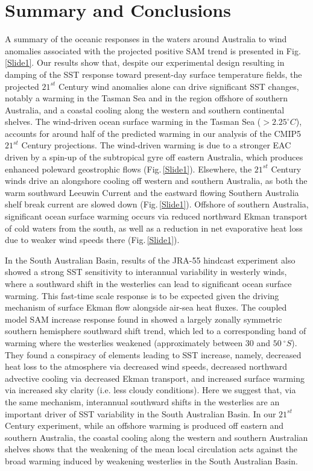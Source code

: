 \documentclass[draft,linenumbers]{agujournal2018}
\begin{document}
\section{Summary and Conclusions}
A summary of the oceanic responses in the waters around Australia to wind anomalies associated with the projected positive SAM trend is presented in Fig.\,\ref{Slide1}. Our results show that, despite our experimental design resulting in damping of the SST response toward present-day surface temperature fields, the projected $21^{st}$ Century wind anomalies alone can drive significant SST changes, notably a warming in the Tasman Sea and in the region offshore of southern Australia, and a coastal cooling along the western and southern continental shelves. The wind-driven ocean surface warming in the Tasman Sea ($> 2.25 ^{\circ}C$), accounts for around half of the predicted warming in our analysis of the CMIP5 $21^{st}$ Century projections. The wind-driven warming is due to a stronger EAC driven by a spin-up of the subtropical gyre off eastern Australia, which produces enhanced poleward geostrophic flows (Fig.\,\ref{Slide1}). Elsewhere, the $21^{st}$ Century winds drive an alongshore cooling off western and southern Australia, as both the warm southward Leeuwin Current and the eastward flowing Southern Australia shelf break current are slowed down (Fig.\,\ref{Slide1}). Offshore of southern Australia, significant ocean surface warming occurs via reduced northward Ekman transport of cold waters from the south, as well as a reduction in net evaporative heat loss due to weaker wind speeds there (Fig.\,\ref{Slide1}).

In the South Australian Basin, results of the JRA-55 hindcast experiment also showed a strong SST sensitivity to interannual variability in westerly winds, where a southward shift in the westerlies can lead to significant ocean surface warming. This fast-time scale response is to be expected given the driving mechanism of surface Ekman flow alongside air-sea heat fluxes. The coupled model SAM increase response found in \citet{SenGupta2006} showed a largely zonally symmetric southern hemisphere southward shift trend, which led to a corresponding band of warming where the westerlies weakened (approximately between $30$ and $50\ ^{\circ}S$). They found a conspiracy of elements leading to SST increase, namely, decreased heat loss to the atmosphere via decreased wind speeds, decreased northward advective cooling via decreased Ekman transport, and increased surface warming via increased sky clarity (i.e. less cloudy conditions). Here we suggest that, via the same mechanism, interannual southward shifts in the westerlies are an important driver of SST variability in the South Australian Basin. In our $21^{st}$ Century experiment, while an offshore warming is produced off eastern and southern Australia, the coastal cooling along the western and southern Australian shelves shows that the weakening of the mean local circulation acts against the broad warming induced by weakening westerlies in the South Australian Basin.
\end{document}
